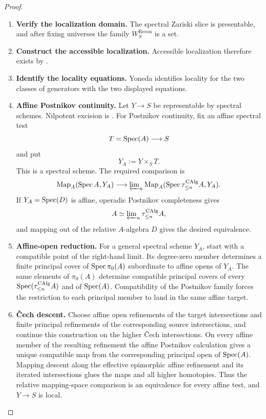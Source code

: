 \begin{proof}
\leavevmode
\begin{enumerate}[label=\textup{(\arabic*)}]
    \item \textbf{Verify the localization domain.}
    The spectral Zariski slice is presentable, and after fixing universes the
    family \(W^{\mathrm{Recon}}_S\) is a set.
    \item \textbf{Construct the accessible localization.}
    Accessible localization therefore
    exists by \cite[Proposition~5.5.4.15]{LurieHigherToposTheory}.
    \item \textbf{Identify the locality equations.}
    Yoneda identifies locality for the two classes of generators with the
    two displayed equations.
    \item \textbf{Affine Postnikov continuity.}
    Let \(Y\to S\) be representable by spectral schemes. Nilpotent excision is
    . For Postnikov continuity, fix an
    affine spectral test
    \[
        T=\operatorname{Spec}(A)\longrightarrow S
    \]
    and put
    \[
        Y_A:=Y\times_ST.
    \]
    This is a spectral scheme. The required comparison is
    \[
        \operatorname{Map}_A(\operatorname{Spec} A,Y_A)
        \longrightarrow
        \varprojlim\nolimits_n
        \operatorname{Map}_A(\operatorname{Spec}\tau_{\leq n}^{\operatorname{CAlg}}A,Y_A).
    \]
    If \(Y_A=\operatorname{Spec}(D)\) is affine, operadic Postnikov completeness gives
    \[
        A\simeq\varprojlim\nolimits_n\tau_{\leq n}^{\operatorname{CAlg}}A,
    \]
    and mapping out of the relative \(A\)-algebra \(D\) gives the desired
    equivalence.
    \item \textbf{Affine-open reduction.}
    For a general spectral scheme \(Y_A\), start with a compatible point of the
    right-hand limit. Its degree-zero member determines a finite principal cover
    of \(\operatorname{Spec}\pi_0(A)\) subordinate to affine opens of \(Y_A\). The same
    elements of \(\pi_0(A)\) determine compatible principal covers of every
    \(\operatorname{Spec}(\tau_{\leq n}^{\operatorname{CAlg}}A)\) and of \(\operatorname{Spec}(A)\). Compatibility of the
    Postnikov family forces the restriction to each principal member to land in
    the same affine target.
    \item \textbf{Čech descent.}
    Choose affine open refinements of the target intersections and finite
    principal refinements of the corresponding source intersections, and continue
    this construction on the higher Čech intersections. On every affine member of the resulting refinement the
    affine Postnikov calculation gives a unique compatible map from the
    corresponding principal open of \(\operatorname{Spec}(A)\). Mapping descent along the
    effective epimorphic affine refinement and its iterated intersections glues
    the maps and all higher homotopies. Thus the relative mapping-space
    comparison is an equivalence for every affine test, and \(Y\to S\) is local.
\end{enumerate}
\end{proof}

